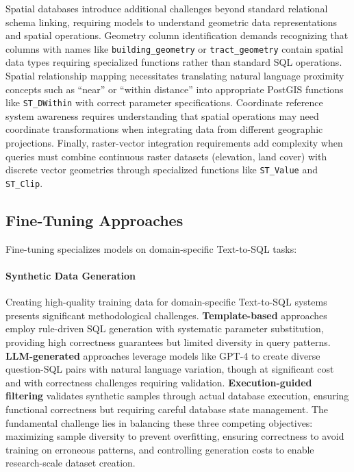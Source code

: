 Spatial databases introduce additional challenges beyond standard relational schema linking, requiring models to understand geometric data representations and spatial operations. Geometry column identification demands recognizing that columns with names like \texttt{building\_geometry} or \texttt{tract\_geometry} contain spatial data types requiring specialized functions rather than standard SQL operations. Spatial relationship mapping necessitates translating natural language proximity concepts such as ``near'' or ``within distance'' into appropriate PostGIS functions like \texttt{ST\_DWithin} with correct parameter specifications. Coordinate reference system awareness requires understanding that spatial operations may need coordinate transformations when integrating data from different geographic projections. Finally, raster-vector integration requirements add complexity when queries must combine continuous raster datasets (elevation, land cover) with discrete vector geometries through specialized functions like \texttt{ST\_Value} and \texttt{ST\_Clip}.

\subsection{Fine-Tuning Approaches}

Fine-tuning specializes models on domain-specific Text-to-SQL tasks:

\paragraph{Synthetic Data Generation}

Creating high-quality training data for domain-specific Text-to-SQL systems presents significant methodological challenges. \textbf{Template-based} approaches employ rule-driven SQL generation with systematic parameter substitution, providing high correctness guarantees but limited diversity in query patterns. \textbf{LLM-generated} approaches leverage models like GPT-4 to create diverse question-SQL pairs with natural language variation, though at significant cost and with correctness challenges requiring validation. \textbf{Execution-guided filtering} validates synthetic samples through actual database execution, ensuring functional correctness but requiring careful database state management. The fundamental challenge lies in balancing these three competing objectives: maximizing sample diversity to prevent overfitting, ensuring correctness to avoid training on erroneous patterns, and controlling generation costs to enable research-scale dataset creation.

